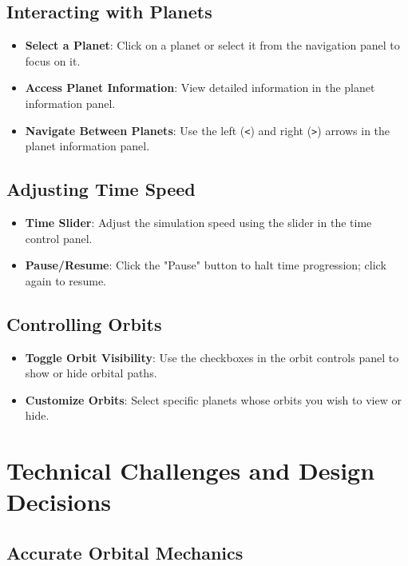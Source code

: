 \documentclass[12pt, a4paper]{article}
\begin{document}
\subsection{Interacting with Planets}

\begin{itemize}
    \item \textbf{Select a Planet}: Click on a planet or select it from the navigation panel to focus on it.
    \item \textbf{Access Planet Information}: View detailed information in the planet information panel.
    \item \textbf{Navigate Between Planets}: Use the left (\texttt{<}) and right (\texttt{>}) arrows in the planet information panel.
\end{itemize}

\subsection{Adjusting Time Speed}

\begin{itemize}
    \item \textbf{Time Slider}: Adjust the simulation speed using the slider in the time control panel.
    \item \textbf{Pause/Resume}: Click the "Pause" button to halt time progression; click again to resume.
\end{itemize}

\subsection{Controlling Orbits}

\begin{itemize}
    \item \textbf{Toggle Orbit Visibility}: Use the checkboxes in the orbit controls panel to show or hide orbital paths.
    \item \textbf{Customize Orbits}: Select specific planets whose orbits you wish to view or hide.
\end{itemize}

\section{Technical Challenges and Design Decisions}

\subsection{Accurate Orbital Mechanics}
\end{document}
